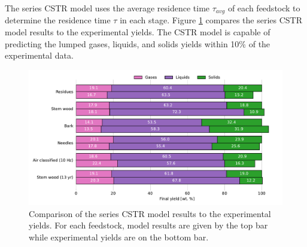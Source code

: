 The series CSTR model uses the average residence time $\tau_{avg}$ of each feedstock to determine the residence time $\tau$ in each stage. Figure \ref{fig:cstr-exp} compares the series CSTR model results to the experimental yields. The CSTR model is capable of predicting the lumped gases, liquids, and solids yields within 10\% of the experimental data.

\begin{figure}[H]
    \centering
    \includegraphics[width=\textwidth]{figures/cstr-exp.pdf}
    \caption{Comparison of the series CSTR model results to the experimental yields. For each feedstock, model results are given by the top bar while experimental yields are on the bottom bar.}
    \label{fig:cstr-exp}
\end{figure}
